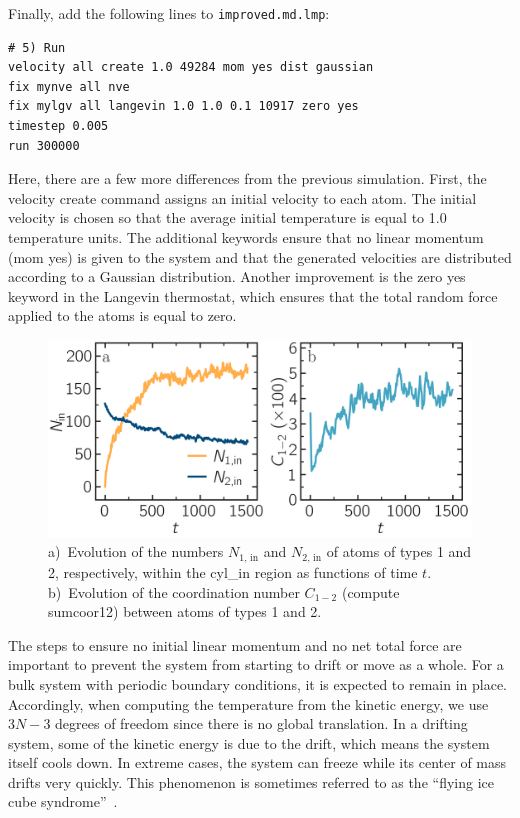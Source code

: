 \documentclass[9pt,tutorial]{livecoms}
\newcommand{\lmpcmd}[1]{\hspace{0pt}\colorbox{listing}{\textcolor{command}{\small{#1}}}\hspace{0pt}} %
\newcommand{\flecmd}[1]{\textcolor{command}{\texttt{#1}}} %
\begin{document}
Finally, add the following lines to \flecmd{improved.md.lmp}:
\begin{lstlisting}
# 5) Run
velocity all create 1.0 49284 mom yes dist gaussian
fix mynve all nve
fix mylgv all langevin 1.0 1.0 0.1 10917 zero yes
timestep 0.005
run 300000
\end{lstlisting}
Here, there are a few more differences from the previous simulation.  First,
the \lmpcmd{velocity create} command assigns an initial velocity to each
atom.  The initial velocity is chosen so that the average initial
temperature is equal to 1.0 temperature units.  The additional keywords
ensure that no linear momentum (\lmpcmd{mom yes}) is given to the
system and that the generated velocities are distributed according to
a Gaussian distribution.  Another improvement is the \lmpcmd{zero yes}
keyword in the Langevin thermostat, which ensures that the total random
force applied to the atoms is equal to zero.

\begin{figure}
\centering
\includegraphics[width=\linewidth]{LJ-mixing}
\caption{a)~Evolution of the numbers $N_\text{1, in}$ and $N_\text{2, in}$ of atoms
of types 1 and 2, respectively, within the \lmpcmd{cyl\_in} region as functions
of time $t$.  b)~Evolution of the coordination number $C_{1-2}$ (compute \lmpcmd{sumcoor12})
between atoms of types 1 and 2.} 
\label{fig:mixing}
\end{figure}

\begin{note}
The steps to ensure no initial linear momentum and no net total
force are important to prevent the system from starting to drift or move as a
whole.  For a bulk system with periodic boundary conditions, it is
expected to remain in place.  Accordingly, when computing the temperature from the
kinetic energy, we use $3N-3$ degrees of freedom since there is no
global translation.  In a drifting system, some of the kinetic energy is
due to the drift, which means the system itself cools down.  In
extreme cases, the system can freeze while its center of mass drifts very quickly.  This phenomenon is
sometimes referred to as the ``flying ice cube syndrome''~\cite{wong2016good}.
\end{note}
\end{document}
